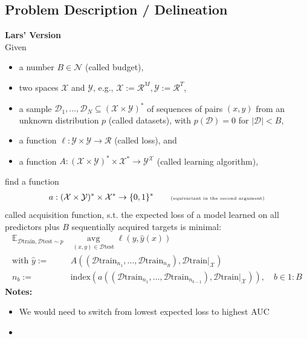 \documentclass[]{article}
\begin{document}
\subsection{Problem Description / Delineation}
\textbf{Lars' Version} \\
Given
\begin{itemize}
	\item a number $B\in\mathcal{N}$ (called budget),
	\item two spaces $\mathcal{X}$ and $\mathcal{Y}$,  {\tiny e.g., $\mathcal{X}:=\mathcal{R}^M, \mathcal{Y}:=\mathcal{R}^T$},
	\item a sample $\mathcal{D}_1,\ldots,\mathcal{D}_N \subseteq (\mathcal{X}\times \mathcal{Y})^*$ of
	sequences of pairs $(x,y)$  from an unknown distribution $p$
	(called datasets),
	{\tiny with $p(\mathcal{D})=0$ for $|\mathcal{D}|<B$,}
	\item a function $\ell:\mathcal{Y}\times \mathcal{Y}\rightarrow \mathcal{R}$ (called loss), and
	\item a function $A:  (\mathcal{X} \times \mathcal{Y})^* \times \mathcal{X}^* \rightarrow \mathcal{Y}^{\mathcal{X}}$
	(called learning algorithm),
\end{itemize}
find a function
\begin{align*}
	a: (\mathcal{X}\times \mathcal{Y})^* \times \mathcal{X}^* \rightarrow \{0,1\}^*
	\quad\quad \text{\tiny (equivariant in the second argument)}
\end{align*}
called acquisition function,
s.t. the expected loss of a model learned on
all predictors 
plus $B$ sequentially acquired
targets is minimal:
\begin{align*}
	\mathbb{E}_{\mathcal{D}\text{train},\mathcal{D}\text{test}\sim p}   &
	\operatorname{avg}\limits_{(x,y)\in\mathcal{D}\text{test}}
	\ell(y, \hat y(x)) 
	\\
	\text{with }
	\hat y:= & A( (\mathcal{D}\text{train}_{n_1},\ldots,\mathcal{D}\text{train}_{n_B}), \mathcal{D}\text{train}|_{\mathcal{X}})
	\\ 
	n_b := & \text{index}( a( (\mathcal{D}\text{train}_{n_1},\ldots,\mathcal{D}\text{train}_{n_{b-1}}), \mathcal{D}\text{train}|_{\mathcal{X}}) ),
	\quad b\in 1{:}B
\end{align*}
\textbf{Notes:}
\begin{itemize}
	\item We would need to switch from lowest expected loss to highest AUC
	\item 
\end{itemize}
\end{document}
